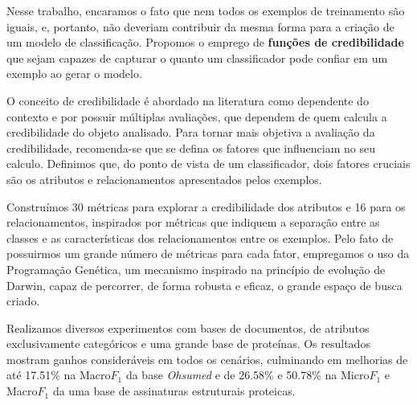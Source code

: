Nesse trabalho, encaramos o fato que nem todos os exemplos de treinamento são iguais, e, portanto, não deveriam contribuir da mesma forma para a criação de um modelo de classificação.
Propomos o emprego de \textbf{funções de credibilidade} que sejam capazes de capturar o quanto um classificador pode confiar em um exemplo ao gerar o modelo.

O conceito de credibilidade é abordado na literatura como dependente do contexto e por possuir múltiplas avaliações, que dependem de quem calcula a credibilidade do objeto analisado.
Para tornar mais objetiva a avaliação da credibilidade, recomenda-se que se defina os fatores que influenciam no seu calculo.
Definimos que, do ponto de vista de um classificador, dois fatores cruciais são os atributos e relacionamentos apresentados pelos exemplos.

Construímos 30 métricas para explorar a credibilidade dos atributos e 16 para os relacionamentos, inspirados por métricas que indiquem a separação entre as classes e as características dos relacionamentos entre os exemplos. Pelo fato de possuirmos um grande número de métricas para cada fator, empregamos o uso da Programação Genética, um mecanismo inspirado na princípio de evolução de Darwin, capaz de percorrer, de forma robusta e eficaz, o grande espaço de busca criado.

Realizamos diversos experimentos com bases de documentos, de atributos exclusivamente categóricos e uma grande base de proteínas. Os resultados mostram ganhos consideráveis em todos os cenários, culminando em melhorias de até 17.51\% na Macro$F_1$ da base \textit{Ohsumed} e de 26.58\% e 50.78\% na Micro$F_1$ e Macro$F_1$ da uma base de  assinaturas estruturais proteicas.


